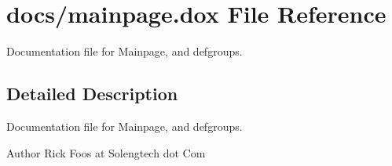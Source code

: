 \hypertarget{mainpage_8dox}{}\section{docs/mainpage.dox File Reference}
\label{mainpage_8dox}


Documentation file for Mainpage, and defgroups.  




\subsection{Detailed Description}
Documentation file for Mainpage, and defgroups. 

\begin{DoxyAuthor}{Author}
Rick Foos at Solengtech dot Com 
\end{DoxyAuthor}
